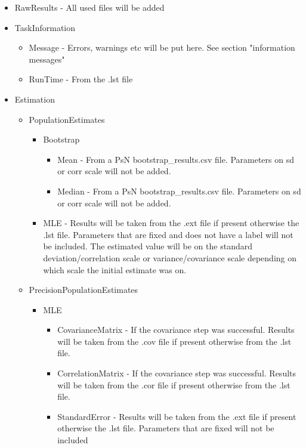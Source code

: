 \begin{itemize}
    \item RawResults - All used files will be added
    \item TaskInformation 
        \begin{itemize}
            \item Message - Errors, warnings etc will be put here. See section "information messages"
            \item RunTime - From the .lst file
        \end{itemize}
    \item Estimation
        \begin{itemize}
            \item PopulationEstimates
            \begin{itemize}
                \item Bootstrap
                \begin{itemize}
                    \item Mean - From a PsN bootstrap\_results.csv file. Parameters on sd or corr scale will not be added.
                    \item Median - From a PsN bootstrap\_results.csv file. Parameters on sd or corr scale will not be added.
                \end{itemize}
                \item MLE - Results will be taken from the .ext file if present otherwise the .lst file. Parameters that are fixed and does not have a label will not be included. The estimated value
                    will be on the standard deviation/correlation scale or variance/covariance scale depending on which scale the initial estimate was on. 
            \end{itemize}
            \item PrecisionPopulationEstimates
            \begin{itemize}
                \item MLE
                \begin{itemize}
                    \item CovarianceMatrix - If the covariance step was successful. Results will be taken from the .cov file if present otherwise from the .lst file.
                    \item CorrelationMatrix - If the covariance step was successful. Results will be taken from the .cor file if present otherwise from the .lst file.
                    \item StandardError - Results will be taken from the .ext file if present otherwise the .lst file. Parameters that are fixed will not be included

\end{itemize}
\end{itemize}
\end{itemize}
\end{itemize}
